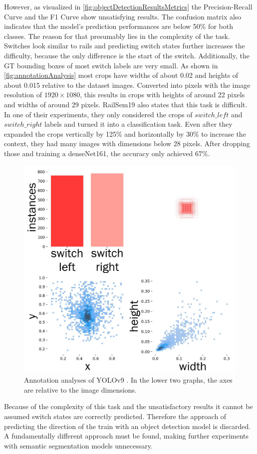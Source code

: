 However, as visualized in \autoref{fig:objectDetectionResultsMetrics} the Precision-Recall Curve and the F1 Curve show unsatisfying results.
The confusion matrix also indicates that the model's prediction performances are below 50\% for both classes.
The reason for that presumably lies in the complexity of the task.
Switches look similar to rails and predicting switch states further increases the difficulty, because the only difference is the start of the switch.
Additionally, the \ac{GT} bounding boxes of most switch labels are very small.
As shown in \autoref{fig:annotationAnalysis} most crops have widths of about 0.02 and heights of about 0.015 relative to the dataset images.
Converted into pixels with the image resolution of $1920 \times 1080$, this results in crops with heights of around 22 pixels and widths of around 29 pixels.
RailSem19 \cite{railsem19dataset} also states that this task is difficult.
In one of their experiments, they only considered the crops of $switch\_left$ and $switch\_right$ labels and turned it into a classification task.
Even after they expanded the crops vertically by 125\% and horizontally by 30\% to increase the context, they had many images with dimensions below 28 pixels.
After dropping those and training a denseNet161, the accuracy only achieved 67\%.

\begin{figure}[H]
    \centering
    \includegraphics[width=0.6\linewidth]{PICs/experiments/objectdetectionExperiment/labels_updated.jpg}
    \caption{Annotation analyses of \ac{YOLO}v9 \cite{YOLOv9GitHub}. In the lower two graphs, the axes are relative to the image dimensions.}
    \label{fig:annotationAnalysis}
\end{figure}

Because of the complexity of this task and the unsatisfactory results it cannot be assumed switch states are correctly predicted.
Therefore the approach of predicting the direction of the train with an object detection model is discarded.
A fundamentally different approach must be found, making further experiments with semantic segmentation models unnecessary.